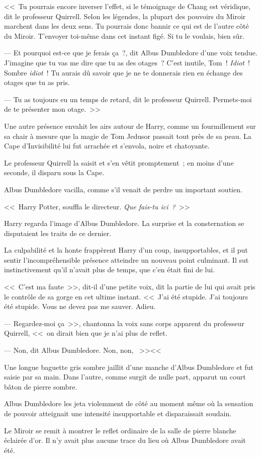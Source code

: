 <<~Tu pourrais encore inverser l'effet, si le témoignage de Chang est véridique, dit le professeur Quirrell. Selon les légendes, la plupart des pouvoirs du Miroir marchent dans les deux sens. Tu pourrais donc bannir ce qui est de l'autre côté du Miroir. T'envoyer toi-même dans cet instant figé. Si tu le voulais, bien sûr.

--- Et pourquoi est-ce que je ferais ça~?, dit Albus Dumbledore d'une voix tendue. J'imagine que tu vas me dire que tu as des otages~? C'est inutile, Tom~! \emph{Idiot}~! Sombre \emph{idiot}~! Tu aurais dû savoir que je ne te donnerais rien en échange des otages que tu as pris.

--- Tu as toujours eu un temps de retard, dit le professeur Quirrell. Permets-moi de te présenter mon otage.~>>

Une autre présence envahit les airs autour de Harry, comme un fourmillement sur sa chair à mesure que la magie de Tom Jedusor passait tout près de sa peau. La Cape d'Invisibilité lui fut arrachée et s'envola, noire et chatoyante.

Le professeur Quirrell la saisit et s'en vêtit promptement~; en moins d'une seconde, il disparu sous la Cape.

Albus Dumbledore vacilla, comme s'il venait de perdre un important soutien.

<<~Harry Potter, souffla le directeur. \emph{Que fais-tu ici~?}~>>

Harry regarda l'image d'Albus Dumbledore. La surprise et la consternation se disputaient les traits de ce dernier.

La culpabilité et la honte frappèrent Harry d'un coup, insupportables, et il put sentir l'incompréhensible présence atteindre un nouveau point culminant. Il sut instinctivement qu'il n'avait plus de temps, que c'en était fini de lui.

<<~C'est ma faute~>>, dit-il d'une petite voix, dit la partie de lui qui avait pris le contrôle de sa gorge en cet ultime instant. <<~J'ai été stupide. J'ai toujours été stupide. Vous ne devez pas me sauver. Adieu.

--- Regardez-moi ça~>>, chantonna la voix sans corps apparent du professeur Quirrell, <<~on dirait bien que je n'ai plus de reflet.

--- Non, dit Albus Dumbledore. Non, non, ~>><<~

Une longue baguette gris sombre jaillit d'une manche d'Albus Dumbledore et fut saisie par sa main. Dans l'autre, comme surgit de nulle part, apparut un court bâton de pierre sombre.

Albus Dumbledore les jeta violemment de côté au moment même où la sensation de pouvoir atteignait une intensité insupportable et disparaissait soudain.

Le Miroir se remit à montrer le reflet ordinaire de la salle de pierre blanche éclairée d'or. Il n'y avait plus aucune trace du lieu où Albus Dumbledore avait été. 

